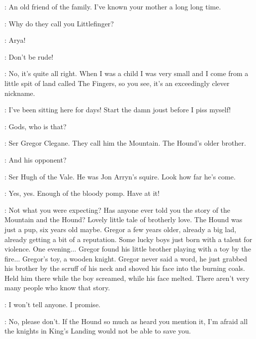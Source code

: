 \LITTLEFINGER: An old friend of the family. I've known your mother a long long time. 

\ARYA: Why do they call you Littlefinger? 

\SANSA: Arya! 

\SEPTAMORDANE: Don't be rude! 

\LITTLEFINGER: No, it's quite all right. When I was a child I was very small and I come from a little spit of land called The Fingers, so you see, it's an exceedingly clever nickname. 

\ROBERT: I've been sitting here for days! Start the damn joust before I piss myself! 


\SANSA: Gods, who is that? 

\LITTLEFINGER: Ser Gregor Clegane. They call him the Mountain. The Hound's older brother. 

\SANSA: And his opponent? 

\LITTLEFINGER: Ser Hugh of the Vale. He was Jon Arryn's squire. Look how far he's come. 

\ROBERT: Yes, yes. Enough of the bloody pomp. Have at it! 


\LITTLEFINGER: Not what you were expecting? Has anyone ever told you the story of the Mountain and the Hound? Lovely little tale of brotherly love. The Hound was just a pup, six years old maybe. Gregor a few years older, already a big lad, already getting a bit of a reputation. Some lucky boys just born with a talent for violence. One evening$\ldots$ Gregor found his little brother playing with a toy by the fire$\ldots$ Gregor's toy, a wooden knight. Gregor never said a word, he just grabbed his brother by the scruff of his neck and shoved his face into the burning coals. Held him there while the boy screamed, while his face melted. There aren't very many people who know that story. 

\SANSA: I won't tell anyone. I promise. 

\LITTLEFINGER: No, please don't. If the Hound so much as heard you mention it, I'm afraid all the knights in King's Landing would not be able to save you. 

\scene


